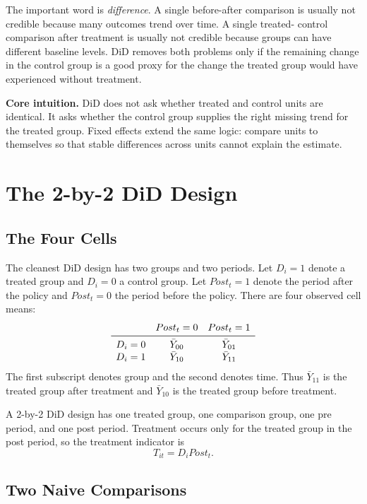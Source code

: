 The important word is \emph{difference}. A single before-after comparison is
usually not credible because many outcomes trend over time. A single treated-
control comparison after treatment is usually not credible because groups can
have different baseline levels. DiD removes both problems only if the remaining
change in the control group is a good proxy for the change the treated group
would have experienced without treatment.

\begin{boxF}
\textbf{Core intuition.} DiD does not ask whether treated and control units are
identical. It asks whether the control group supplies the right missing trend
for the treated group. Fixed effects extend the same logic: compare units to
themselves so that stable differences across units cannot explain the estimate.
\end{boxF}

\section{The 2-by-2 DiD Design}

\subsection{The Four Cells}

The cleanest DiD design has two groups and two periods. Let $D_i=1$ denote a
treated group and $D_i=0$ a control group. Let $Post_t=1$ denote the period after
the policy and $Post_t=0$ the period before the policy. There are four observed
cell means:
\[
\begin{array}{c@{\quad}cc}
& Post_t=0 & Post_t=1 \\
\midrule
D_i=0 & \bar{Y}_{00} & \bar{Y}_{01}\\
D_i=1 & \bar{Y}_{10} & \bar{Y}_{11}
\end{array}
\]
The first subscript denotes group and the second denotes time. Thus
$\bar{Y}_{11}$ is the treated group after treatment and $\bar{Y}_{10}$ is the
treated group before treatment.

\begin{defN}
A 2-by-2 DiD design has one treated group, one comparison group, one pre period,
and one post period. Treatment occurs only for the treated group in the post
period, so the treatment indicator is
\[
    T_{it}=D_i Post_t.
\]
\end{defN}

\subsection{Two Naive Comparisons}

